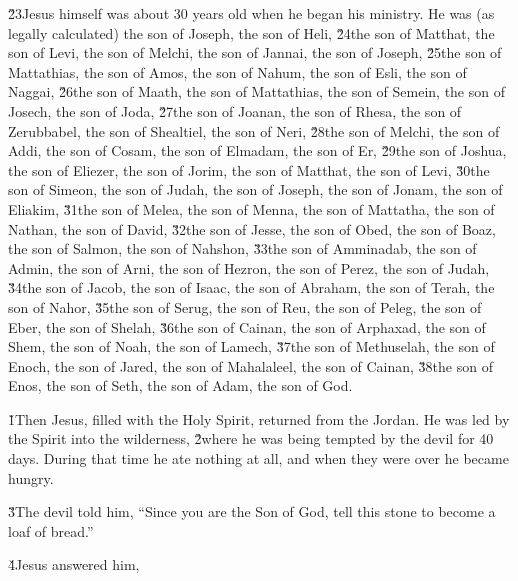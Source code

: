 \v{23}Jesus himself was about 30 years old when he began his ministry. He was (as legally calculated) the son of Joseph, the son of Heli, \v{24}the son of Matthat, the son of Levi, the son of Melchi, the son of Jannai, the son of Joseph, \v{25}the son of Mattathias, the son of Amos, the son of Nahum, the son of Esli, the son of Naggai, \v{26}the son of Maath, the son of Mattathias, the son of Semein, the son of Josech, the son of Joda, \v{27}the son of Joanan, the son of Rhesa, the son of Zerubbabel, the son of Shealtiel, the son of Neri, \v{28}the son of Melchi, the son of Addi, the son of Cosam, the son of Elmadam, the son of Er, \v{29}the son of Joshua, the son of Eliezer, the son of Jorim, the son of Matthat, the son of Levi, \v{30}the son of Simeon, the son of Judah, the son of Joseph, the son of Jonam, the son of Eliakim, \v{31}the son of Melea, the son of Menna, the son of Mattatha, the son of Nathan, the son of David, \v{32}the son of Jesse, the son of Obed, the son of Boaz, the son of Salmon, the son of Nahshon, \v{33}the son of Amminadab, the son of Admin, the son of Arni, the son of Hezron, the son of Perez, the son of Judah, \v{34}the son of Jacob, the son of Isaac, the son of Abraham, the son of Terah, the son of Nahor, \v{35}the son of Serug, the son of Reu, the son of Peleg, the son of Eber, the son of Shelah, \v{36}the son of Cainan, the son of Arphaxad, the son of Shem, the son of Noah, the son of Lamech, \v{37}the son of Methuselah, the son of Enoch, the son of Jared, the son of Mahalaleel, the son of Cainan, \v{38}the son of Enos, the son of Seth, the son of Adam, the son of God.

\v{1}Then Jesus, filled with the Holy Spirit, returned from the Jordan. He was led by the Spirit into the wilderness, \v{2}where he was being tempted by the devil for 40 days. During that time he ate nothing at all, and when they were over he became hungry.

\v{3}The devil told him, ``Since you are the Son of God, tell this stone to become a loaf of bread.''

\v{4}Jesus answered him, 

